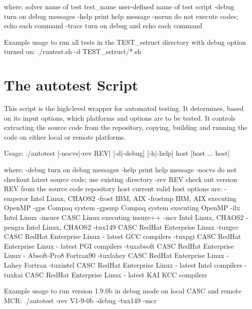 where:
   {solver}     name of test
   {test\_name} user-defined name of test script
   -debug       turn on debug messages
   -help        print help message
   -norun       do not execute codes; echo each command
   -trace       turn on debug and echo each command

Example usage to run all tests in the TEST\_sstruct directory with debug option turned on:
./runtest.sh -d TEST\_sstruct/*.sh

\section{The autotest Script}
\label{The autotest Script}

This script is the high-level wrapper for automated testing.  It determines, based 
on its input options, which platforms and options are to be tested.  It controls
extracting the source code from the repository, copying, building and running the
code on either local or remote platforms.

Usage:
./autotest [-nocvs|-rev REV] [-d|-debug] [-h|-help] host [host ... host]

where:
   -debug       turn on debug messages
   -help        print help message
   -nocvs       do not checkout latest source code; use existing  directory
   -rev REV     check out version REV from the source code repository
   host         current valid host options are:
                   -emperor    Intel Linux, CHAOS2
                   -frost      IBM, AIX
                   -frostmp    IBM, AIX executing OpenMP
                   -gps        Compaq system
                   -gpsmp      Compaq system executing OpenMP
                   -ilx        Intel Linux
                   -insure     CASC Linux executing insure++
                   -mcr        Intel Linux, CHAOS2
                   -pengra     Intel Linux, CHAOS2
                   -tux149     CASC RedHat Enterprise Linux
                   -tuxgcc     CASC RedHat Enterprise Linux - latest GCC compilers
                   -tuxpgi     CASC RedHat Enterprise Linux - latest PGI compilers
                   -tuxabsoft  CASC RedHat Enterprise Linux - Absoft-Pro8 Fortran90
                   -tuxlahey   CASC RedHat Enterprise Linux - Lahey Fortran
                   -tuxintel   CASC RedHat Enterprise Linux - latest Intel compilers
                   -tuxkai     CASC RedHat Enterprise Linux - latest KAI KCC compilers

Example usage to run version 1.9.0b in debug mode on local CASC and remote MCR:
./autotest -rev V1-9-0b -debug -tux149 -mcr
